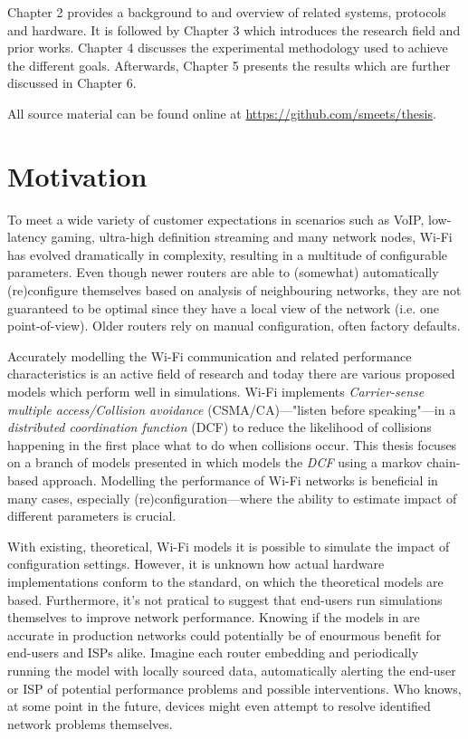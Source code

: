 Chapter 2 provides a background to and overview of related systems, protocols
and hardware. It is followed by Chapter 3 which introduces the research field
and prior works. Chapter 4 discusses the experimental methodology used to
achieve the different goals. Afterwards, Chapter 5 presents the results which
are further discussed in Chapter 6.

All source material can be found online at \url{https://github.com/smeets/thesis}.

\section{Motivation}

To meet a wide variety of customer expectations in scenarios such as VoIP,
low-latency gaming, ultra-high definition streaming and many network nodes,
Wi-Fi has evolved dramatically in complexity, resulting in a multitude of
configurable parameters. Even though newer routers are able to (somewhat)
automatically (re)configure themselves based on analysis of neighbouring
networks, they are not guaranteed to be optimal since they have a local view
of the network (i.e. one point-of-view). Older routers rely on manual
configuration, often factory defaults.

Accurately modelling the Wi-Fi communication and related performance
characteristics is an active field of research and today there are various
proposed models which perform well in simulations. Wi-Fi implements
\emph{Carrier-sense multiple access/Collision avoidance} (CSMA/CA)—"listen
before speaking"—in a \emph{distributed coordination function} (DCF) to reduce
the likelihood of collisions happening in the first place what to do when
collisions occur.  This thesis focuses on a branch of models presented in
\cite{bianchi} which models the \emph{DCF} using a markov chain-based
approach. Modelling the performance of Wi-Fi networks is beneficial in many
cases, especially (re)configuration—where the ability to estimate impact of
different parameters is crucial.

With existing, theoretical, Wi-Fi models it is possible to simulate the impact
of configuration settings. However, it is unknown how actual hardware
implementations conform to the standard, on which the theoretical models are
based. Furthermore, it's not pratical to suggest that end-users run
simulations themselves to improve network performance. Knowing if the models
in \cite{felemban} are accurate in production networks could potentially be of
enourmous benefit for end-users and ISPs alike. Imagine each router embedding
and periodically running the model with locally sourced data, automatically
alerting the end-user or ISP of potential performance problems and possible
interventions. Who knows, at some point in the future, devices might even
attempt to resolve identified network problems themselves.

